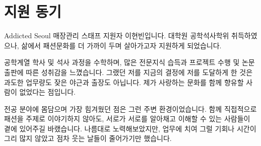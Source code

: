  
 
 
 

\section*{지원 동기}
Addicted Seoul 매장관리 스태프 지원자 이현빈입니다. 대학원 공학석사학위 취득하였으나, 삶에서 패션문화를 더 가까이 두며 살아가고자 지원하게 되었습니다.

공학계열 학사 및 석사 과정을 수학하며, 많은 전문지식 습득과 프로젝트 수행 및 논문출판에 따른 성취감을 느꼈습니다. 그랬던 저를 지금의 결정에 저를 도달하게 한 것은 과도한 업무량도 잦은 야근과 출장도 아닙니다. 제가 사랑하는 문화를 함께 향유할 사람이 없었다는 점입니다.

전공 분야에 몸담으며 가장 힘겨웠던 점은 그런 주변 환경이었습니다. 함께 직접적으로 패션을 주제로 이야기하지 않아도, 서로가 서로를 알아채고 이해할 수 있는 사람들이 곁에 있어주길 바랬습니다. 나름대로 노력해보았지만, 업무에 치여 그럴 기회나 시간이 그리 많지 않았고 점차 웃는 날들이 줄어가기만 했습니다.

